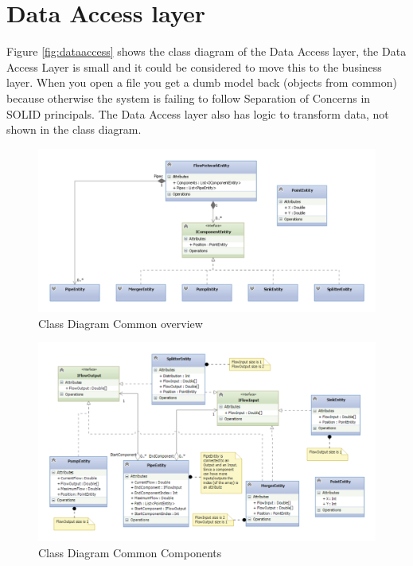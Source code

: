 \section{Data Access layer}
Figure \ref{fig:dataaccess} shows the class diagram of the Data Access layer, the Data Access Layer is small and it could be considered to move this to the business layer. When you open a file you get a dumb model back (objects from common) because otherwise the system is failing to follow Separation of Concerns in SOLID principals. The Data Access layer also has logic to transform data, not shown in the class diagram.

\begin{figure}
	\centering
	\includegraphics[width=\textwidth]{figures/ClassCommonOverall.pdf}
	\caption{Class Diagram Common overview}
	\label{fig:commonoverview}
\end{figure}

\begin{figure}
	\centering
	\includegraphics[width=\textwidth]{figures/ClassCommonComponents.pdf}
	\caption{Class Diagram Common Components}
	\label{fig:classcomponents}
\end{figure}

